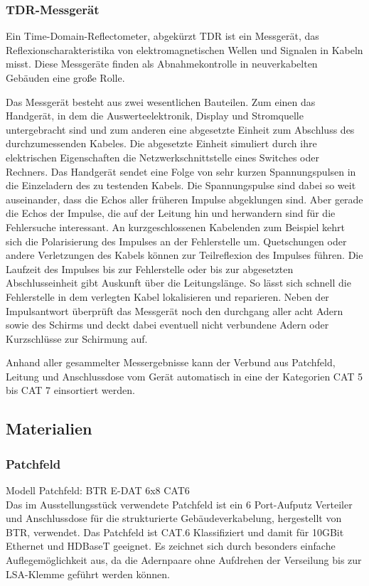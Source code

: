 \documentclass[
a4paper,     %
 headsepline, %
11pt         %
]{scrartcl}  %
\begin{document}
\subsubsection{TDR-Messgerät}
Ein Time-Domain-Reflectometer, abgekürzt TDR ist ein Messgerät, das Reflexionscharakteristika von elektromagnetischen Wellen und Signalen in Kabeln misst. 
Diese Messgeräte finden als Abnahmekontrolle in neuverkabelten Gebäuden eine große Rolle.

Das Messgerät besteht aus zwei wesentlichen Bauteilen. 
Zum einen das  Handgerät, in dem die Auswerteelektronik, Display und Stromquelle untergebracht sind und zum anderen eine abgesetzte Einheit zum Abschluss des durchzumessenden Kabeles.
Die abgesetzte Einheit simuliert durch ihre elektrischen Eigenschaften die Netzwerkschnittstelle eines Switches oder Rechners.
Das Handgerät sendet eine Folge von sehr kurzen Spannungspulsen in die Einzeladern des zu testenden Kabels.
Die Spannungspulse sind dabei so weit auseinander, dass die Echos aller früheren Impulse abgeklungen sind. 
Aber gerade die Echos der Impulse, die auf der Leitung hin und herwandern sind für die Fehlersuche interessant.
An kurzgeschlossenen Kabelenden zum Beispiel kehrt sich die Polarisierung des Impulses an der Fehlerstelle um. 
Quetschungen oder andere Verletzungen des Kabels können zur Teilreflexion des Impulses führen. 
Die Laufzeit des Impulses bis zur Fehlerstelle oder bis zur abgesetzten Abschlusseinheit gibt Auskunft über die Leitungslänge. 
So lässt sich schnell die Fehlerstelle in dem verlegten Kabel lokalisieren und reparieren.
Neben der Impulsantwort überprüft das Messgerät noch den durchgang aller acht Adern sowie des Schirms und deckt dabei eventuell nicht verbundene Adern oder Kurzschlüsse zur Schirmung auf.

Anhand aller gesammelter Messergebnisse kann der Verbund aus Patchfeld, Leitung und Anschlussdose vom Gerät automatisch in eine der Kategorien CAT 5 bis CAT 7 einsortiert werden.



\subsection{Materialien}
\subsubsection{Patchfeld}
Modell Patchfeld: BTR E-DAT 6x8 CAT6 \\
Das im Ausstellungsstück verwendete Patchfeld ist ein 6 Port-Aufputz Verteiler und Anschlussdose für die strukturierte Gebäudeverkabelung, hergestellt von BTR, verwendet. 
Das Patchfeld ist CAT.6 Klassifiziert und damit für 10GBit Ethernet und HDBaseT geeignet. 
Es zeichnet sich durch besonders einfache Auflegemöglichkeit aus, da die Adernpaare ohne Aufdrehen der Verseilung bis zur LSA-Klemme geführt werden können.
\end{document}

